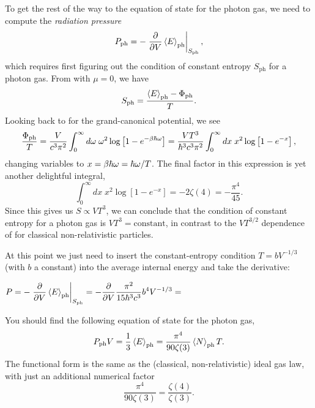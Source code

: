 To get the rest of the way to the equation of state for the photon gas, we need to compute the \textit{radiation pressure}
\begin{equation*}
  P_{\text{ph}} = -\left. \frac{\partial }{\partial V} \left\langle E \right\rangle_{\text{ph}} \right|_{S_{\text{ph}}},
\end{equation*}
which requires first figuring out the condition of constant entropy $S_{\text{ph}}$ for a photon gas.
From  with $\mu = 0$, we have
\begin{equation*}
  S_{\text{ph}} = \frac{\left\langle E \right\rangle_{\text{ph}} - \Phi_{\text{ph}}}{T}.
\end{equation*}
Looking back to  for the grand-canonical potential, we see
\begin{equation*}
  \frac{\Phi_{\text{ph}}}{T} = \frac{V}{c^3 \pi^2} \int_0^{\infty} d\omega \; \omega^2 \log\left[1 - e^{-\beta \hbar \omega}\right] = \frac{VT^3}{\hbar^3 c^3 \pi^2} \int_0^{\infty} dx \; x^2 \log\left[1 - e^{-x}\right],
\end{equation*}
changing variables to $x = \beta \hbar \omega = \hbar \omega / T$.
The final factor in this expression is yet another delightful integral,
\begin{equation*}
  \int_0^{\infty} dx \; x^2 \log\left[1 - e^{-x}\right] = -2\zeta(4) = -\frac{\pi^4}{45}.
\end{equation*}
Since this gives us $S \propto VT^3$, we can conclude that the condition of constant entropy for a photon gas is $V T^3 = \mbox{constant}$, in contrast to the $V T^{3/2}$ dependence of  for classical non-relativistic particles.

At this point we just need to insert the constant-entropy condition $T = b V^{-1 / 3}$ (with $b$ a constant) into the average internal energy and take the derivative:
\begin{mdframed}
  $\displaystyle P = -\left. \frac{\partial }{\partial V} \left\langle E \right\rangle_{\text{ph}} \right|_{S_{\text{ph}}} = -\frac{\partial }{\partial V} \frac{\pi^2}{15 \hbar^3 c^3} b^4 V^{-1 / 3} = $ \\[100 pt]
\end{mdframed}
You should find the following equation of state for the photon gas,
\begin{equation}
  P_{\text{ph}} V = \frac{1}{3} \left\langle E \right\rangle_{\text{ph}} = \frac{\pi^4}{90\zeta(3)} \left\langle N \right\rangle_{\text{ph}} T.
\end{equation}
The functional form is the same as the (classical, non-relativistic) ideal gas law, with just an additional numerical factor
\begin{equation*}
  \frac{\pi^4}{90\zeta(3)} = \frac{\zeta(4)}{\zeta(3)}.
\end{equation*}



